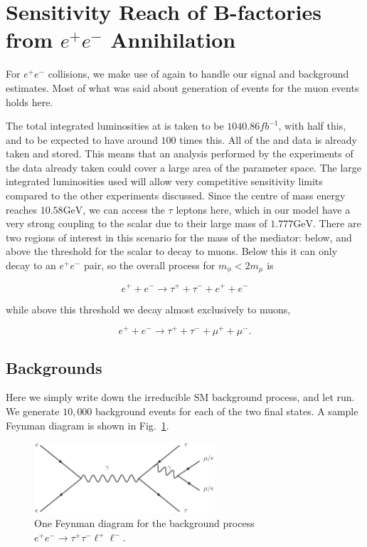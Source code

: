 \section{Sensitivity Reach of B-factories from $e^+ e^-$ Annihilation}
For $e^+ e^-$ collisions, we make use of \madgraph again to handle our signal and background estimates.
Most of what was said about generation of events for the muon events holds here.

The total integrated luminosities at \belle is taken to be $1040.86fb^{-1}$, with \babar half this, and \belletwo to be expected to have around $100$ times this.
All of the \babar and \belle data is already taken and stored.
This means that an analysis performed by the experiments of the data already taken could cover a large area of the parameter space.
The large integrated luminosities used will allow very competitive sensitivity limits compared to the other experiments discussed.
Since the centre of mass energy reaches $10.58\textrm{GeV}$, we can access the $\tau$ leptons here, which in our model have a very strong coupling to the scalar due to their large mass of $1.777\textrm{GeV}$.
There are two regions of interest in this scenario for the mass of the mediator: below, and above the threshold for the scalar to decay to muons.
Below this it can only decay to an $e^+ e^-$ pair, so the overall process for $m_\phi < 2m_\mu$ is

\begin{equation}
    e^+ + e^- \rightarrow \tau^+ + \tau^- + e^+ + e^-
\end{equation}

\noindent while above this threshold we decay almost exclusively to muons,

\begin{equation}
    e^+ + e^- \rightarrow \tau^+ + \tau^- + \mu^+ + \mu^-\textrm{.}
\end{equation}

\subsection{Backgrounds}
Here we simply write down the irreducible SM background process, and let \madgraph run.
We generate $10,000$ background events for each of the two final states.
A sample Feynman diagram is shown in Fig.\ \ref{fig:ee_tautaull_SM}.

\begin{figure}[h]
    \centering
    \includegraphics[width=0.6\textwidth]{Figures/feynman_diagrams/ee_tautaull_SM}
    \caption{One Feynman diagram for the background process $e^+ e^- \rightarrow \tau^+ \tau^- \ell^+ \ell^-$.}
    \label{fig:ee_tautaull_SM}
\end{figure}

